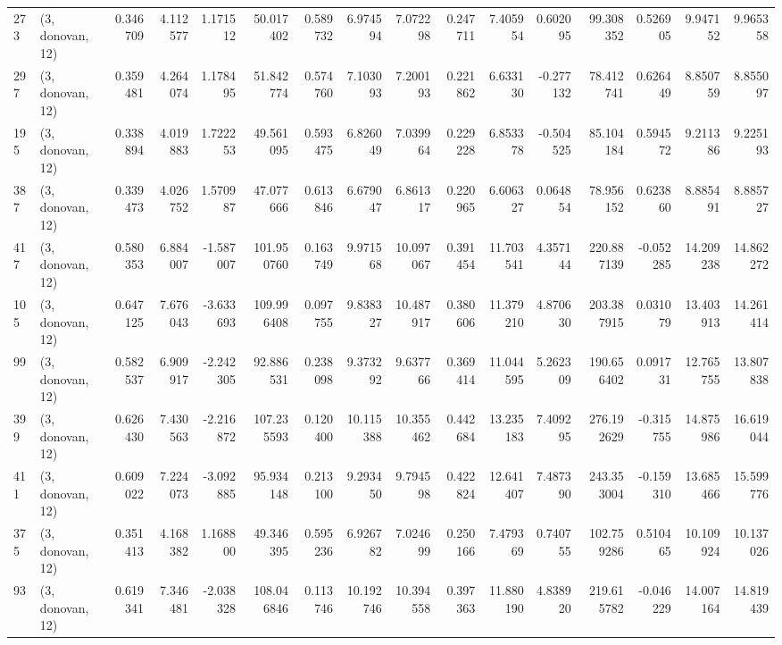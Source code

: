 \begin{tabular}{llrrrrrrrrrrrrrr}
273 &  (3, donovan, 12) &   0.346709 &   4.112577 &   1.171512 &    50.017402 &   0.589732 &   6.974594 &   7.072298 &  0.247711 &   7.405954 &   0.602095 &    99.308352 &  0.526905 &   9.947152 &   9.965358 \\
297 &  (3, donovan, 12) &   0.359481 &   4.264074 &   1.178495 &    51.842774 &   0.574760 &   7.103093 &   7.200193 &  0.221862 &   6.633130 &  -0.277132 &    78.412741 &  0.626449 &   8.850759 &   8.855097 \\
195 &  (3, donovan, 12) &   0.338894 &   4.019883 &   1.722253 &    49.561095 &   0.593475 &   6.826049 &   7.039964 &  0.229228 &   6.853378 &  -0.504525 &    85.104184 &  0.594572 &   9.211386 &   9.225193 \\
387 &  (3, donovan, 12) &   0.339473 &   4.026752 &   1.570987 &    47.077666 &   0.613846 &   6.679047 &   6.861317 &  0.220965 &   6.606327 &   0.064854 &    78.956152 &  0.623860 &   8.885491 &   8.885727 \\
417 &  (3, donovan, 12) &   0.580353 &   6.884007 &  -1.587007 &   101.950760 &   0.163749 &   9.971568 &  10.097067 &  0.391454 &  11.703541 &   4.357144 &   220.887139 & -0.052285 &  14.209238 &  14.862272 \\
105 &  (3, donovan, 12) &   0.647125 &   7.676043 &  -3.633693 &   109.996408 &   0.097755 &   9.838327 &  10.487917 &  0.380606 &  11.379210 &   4.870630 &   203.387915 &  0.031079 &  13.403913 &  14.261414 \\
99  &  (3, donovan, 12) &   0.582537 &   6.909917 &  -2.242305 &    92.886531 &   0.238098 &   9.373292 &   9.637766 &  0.369414 &  11.044595 &   5.262309 &   190.656402 &  0.091731 &  12.765755 &  13.807838 \\
399 &  (3, donovan, 12) &   0.626430 &   7.430563 &  -2.216872 &   107.235593 &   0.120400 &  10.115388 &  10.355462 &  0.442684 &  13.235183 &   7.409295 &   276.192629 & -0.315755 &  14.875986 &  16.619044 \\
411 &  (3, donovan, 12) &   0.609022 &   7.224073 &  -3.092885 &    95.934148 &   0.213100 &   9.293450 &   9.794598 &  0.422824 &  12.641407 &   7.487390 &   243.353004 & -0.159310 &  13.685466 &  15.599776 \\
375 &  (3, donovan, 12) &   0.351413 &   4.168382 &   1.168800 &    49.346395 &   0.595236 &   6.926782 &   7.024699 &  0.250166 &   7.479369 &   0.740755 &   102.759286 &  0.510465 &  10.109924 &  10.137026 \\
93  &  (3, donovan, 12) &   0.619341 &   7.346481 &  -2.038328 &   108.046846 &   0.113746 &  10.192746 &  10.394558 &  0.397363 &  11.880190 &   4.838920 &   219.615782 & -0.046229 &  14.007164 &  14.819439 \\

\end{tabular}
